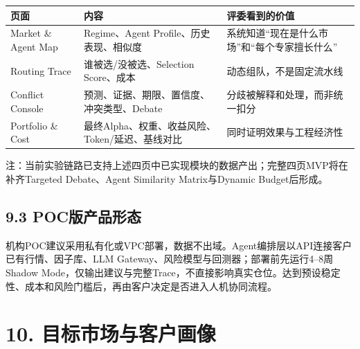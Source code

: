 \documentclass[12pt,a4paper]{ctexart}
\begin{document}
\begin{longtable}[]{@{}
  >{\raggedright\arraybackslash}p{}
  >{\raggedright\arraybackslash}p{}
  >{\raggedright\arraybackslash}p{}@{}}
\toprule\noalign{}
\begin{minipage}[b]{\linewidth}\centering
\textbf{页面}
\end{minipage} & \begin{minipage}[b]{\linewidth}\centering
\textbf{内容}
\end{minipage} & \begin{minipage}[b]{\linewidth}\centering
\textbf{评委看到的价值}
\end{minipage} \\
\midrule\noalign{}
\endhead
\bottomrule\noalign{}
\endlastfoot
Market \& Agent Map & Regime、Agent Profile、历史表现、相似度 &
系统知道``现在是什么市场''和``每个专家擅长什么'' \\
Routing Trace & 谁被选/没被选、Selection Score、成本 &
动态组队，不是固定流水线 \\
Conflict Console & 预测、证据、期限、置信度、冲突类型、Debate &
分歧被解释和处理，而非统一扣分 \\
Portfolio \& Cost & 最终Alpha、权重、收益风险、Token/延迟、基线对比 &
同时证明效果与工程经济性 \\
\end{longtable}

注：当前实验链路已支持上述四页中已实现模块的数据产出；完整四页MVP将在补齐Targeted
Debate、Agent Similarity Matrix与Dynamic Budget后形成。

\subsection{\texorpdfstring{\textbf{9.3
POC版产品形态}}{9.3 POC版产品形态}}\label{pocux7248ux4ea7ux54c1ux5f62ux6001}

机构POC建议采用私有化或VPC部署，数据不出域。Agent编排层以API连接客户已有行情、因子库、LLM
Gateway、风险模型与回测器；部署前先运行4--8周Shadow
Mode，仅输出建议与完整Trace，不直接影响真实仓位。达到预设稳定性、成本和风险门槛后，再由客户决定是否进入人机协同流程。

\section{\texorpdfstring{\textbf{10.
目标市场与客户画像}}{10. 目标市场与客户画像}}\label{ux76eeux6807ux5e02ux573aux4e0eux5ba2ux6237ux753bux50cf}
\end{document}

